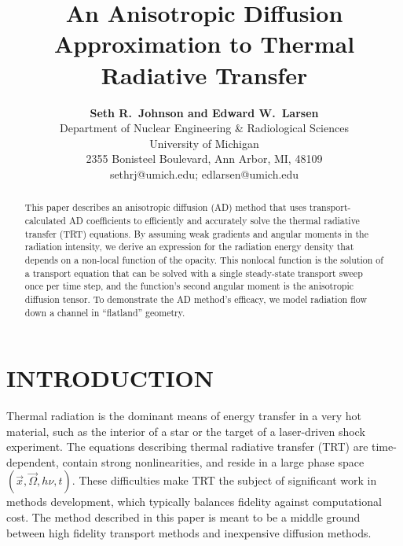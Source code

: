 \documentclass[11pt,letter,twoside]{mc2011}
\begin{document}
\title{An Anisotropic Diffusion Approximation to Thermal Radiative
Transfer}

\author{
\textbf{Seth R.~Johnson and Edward W.~Larsen}\\
Department of Nuclear Engineering \& Radiological Sciences\\
University of Michigan \\
2355 Bonisteel Boulevard, Ann Arbor, MI, 48109\\
sethrj@umich.edu; edlarsen@umich.edu
}

\maketitle

\thispagestyle{empty}

\begin{abstract}
This paper describes an anisotropic diffusion (AD) method that uses
transport-calculated AD coefficients to efficiently and accurately solve the
thermal radiative transfer (TRT) equations. By assuming weak gradients and angular moments in the radiation
intensity, we derive an expression for the radiation energy density that
depends on a non-local function of the opacity. This nonlocal function is the
solution of a transport equation that can be solved with a single steady-state
transport sweep once per time step, and the function's second angular moment is
the anisotropic diffusion tensor.
To demonstrate the AD method's efficacy, we model radiation flow down a channel 
in ``flatland'' geometry. 


\end{abstract}

\newcommand\authorname{Seth~R.~Johnson and Edward~W.~Larsen}
\newcommand\shorttitlename{Anisotropic diffusion approximation to TRT}


\section{\MakeUppercase{Introduction}}
Thermal radiation is the dominant means of energy transfer in a very hot
material, such as the interior
of a star or the
target of a laser-driven shock experiment. The equations describing thermal
radiative transfer (TRT) are
time-dependent, contain strong nonlinearities, and reside in a large phase
space $(\vec{x}, \vec{\Omega}, h\nu, t)$.
These difficulties make TRT the subject of significant work in methods
development, which typically balances fidelity against computational cost. The
method described in this paper is meant to be a middle ground between high
fidelity transport methods and inexpensive diffusion methods.
\end{document}
